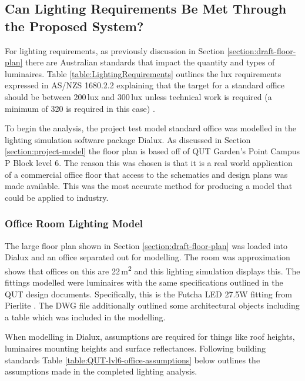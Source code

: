 \subsection{Can Lighting Requirements Be Met Through the Proposed System?}

For lighting requirements, as previously discussion in Section \ref{section:draft-floor-plan} there are Australian standards that impact the quantity and types of luminaires. Table \ref{table:LightingRequirements} outlines the lux requirements expressed in AS/NZS 1680.2.2 explaining that the target for a standard office should be between 200\,lux and 300\,lux unless technical work is required (a minimum of 320 is required in this case) \cite{StandardsAustralia2006_2}.
\newline

To begin the analysis, the project test model standard office was modelled in the lighting simulation software package Dialux. As discussed in Section \ref{section:project-model} the floor plan is based off of QUT Garden's Point Campus P Block level 6. The reason this was chosen is that it is a real world application of a commercial office floor that access to the schematics and design plans was made available. This was the most accurate method for producing a model that could be applied to industry. 

\subsubsection{Office Room Lighting Model}   

The large floor plan shown in Section \ref{section:draft-floor-plan} was loaded into Dialux and an office separated out for modelling. The room was approximation shows that offices on this are 22\,\si{m^2} and this lighting simulation displays this. The fittings modelled were luminaires with the same specifications outlined in the QUT design documents. Specifically, this is the Futcha LED 27.5W fitting from Pierlite \cite{website:Pierlite1}. The DWG file additionally outlined some architectural objects including a table which was included in the modelling. 
\newline

When modelling in Dialux, assumptions are required for things like roof heights, luminaires mounting heights and surface reflectances. Following building standards Table \ref{table:QUT-lvl6-office-assumptions} below outlines the assumptions made in the completed lighting analysis. 

